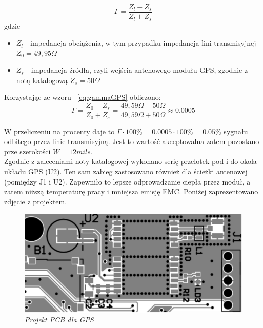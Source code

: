 \documentclass[eng,printmode]{mgr}
\begin{document}
\begin{equation}
\Gamma= \frac{Z_l - Z_s}{Z_l + Z_s} \label{eq:gammaGPS}
\end{equation}
gdzie
\begin{itemize}
  \item $Z_l$ - impedancja obciążenia, w tym przypadku impedancja lini transmisyjnej $Z_0 = 49,95 \Omega$
  \item $Z_s$ - impedancja źródła, czyli wejścia antenowego modułu GPS, zgodnie z notą katalogową $Z_s = 50 \Omega$
\end{itemize}

Korzystając ze wzoru ~\ref{eq:gammaGPS} obliczono:
\begin{equation}
\Gamma= \frac{Z_0 - Z_s}{Z_0 + Z_s} = \frac{49,59\Omega -50\Omega}{49,59\Omega  + 50\Omega } \approx 0.0005
\end{equation}

W przeliczeniu na procenty daje to $\Gamma \cdot 100\% = 0.0005 \cdot 100\% = 0.05\%$ sygnału odbitego przez linie transmisyjną. Jest to wartość akceptowalna zatem pozostano prze szerokości $W = 12 mils$.\\

Zgodnie z zaleceniami noty katalogowej wykonano serię przelotek pod i do okola układu GPS (U2). Ten sam zabieg zastosowano również dla ścieżki antenowej (pomiędzy J1 i U2). Zapewniło to lepsze odprowadzanie ciepła przez moduł, a zatem niższą temperaturę pracy i mniejsza emisję EMC. Poniżej zaprezentowano zdjęcie z projektem.
\begin{figure}[!h]
    \centering
    \includegraphics[width=15cm]{pcb/gps.png}
    \caption{\textit{\scriptsize Projekt PCB dla GPS}}
\end{figure}
\end{document}
